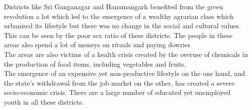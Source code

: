 \documentclass{article}
\begin{document}
Districts like Sri Ganganagar and Hanumangarh benefited from the green revolution a lot which led to the emergence of a wealthy agrarian class which urbanised its lifestyle but there was no change in the social and cultural values. This can be seen by the poor sex ratio of these districts. The people in these areas also spend a lot of moneys on rituals and paying dowries \\
The areas are also victims of a health crisis created by the overuse of chemicals in the production of food items, including vegetables and fruits.\\
The emergence of an expensive yet non-productive lifestyle on the one hand, and the state’s withdrawal from the job market on the other, has created a severe socio-economic crisis. There are a large number of educated yet unemployed youth in all these districts.
\end{document}
